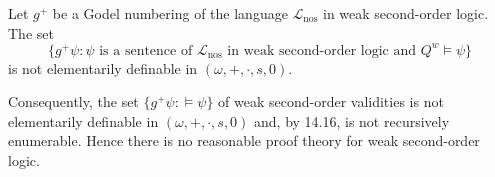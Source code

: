 Let $g^+$ be a Godel numbering of the language $\mathcal{L}_{\text{nos}}$ in weak second-order logic. The set
$$\{g^+ \psi : \psi \text{ is a sentence of } \mathcal{L}_{\text{nos}} \text{ in weak second-order logic and } Q^w \models \psi\}$$
is not elementarily definable in $(\omega, +, \cdot, s, 0)$.

Consequently, the set $\{g^+ \psi : \models \psi\}$ of weak second-order validities is not elementarily definable in $(\omega, +, \cdot, s, 0)$ and, by 14.16, is not recursively enumerable. Hence there is no reasonable proof theory for weak second-order logic.
